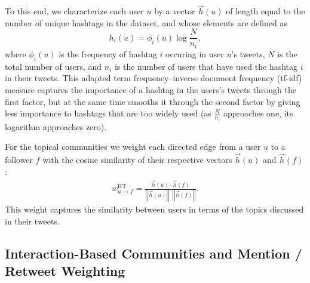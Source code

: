 \documentclass[10pt,letterpaper]{article}
\begin{document}
To this end, we characterize each user $u$ by a vector $\vec{h}(u)$ of length equal to the number of unique hashtags in the dataset, and whose elements are defined as
\begin{equation}
h_i(u) = \phi_i(u)\log{ \frac{N}{n_i} },
\end{equation}
where $\phi_i(u)$ is the frequency of hashtag $i$ occuring in user $u$'s tweets, $N$ is the total number of users, and $n_i$ is the number of users that have used the hashtag $i$ in their tweets. This adapted term frequency--inverse document frequency (tf-idf) measure \cite{salton_introduction_1983} captures the importance of a hashtag in the users's tweets through the first factor, but at the same time smooths it through the second factor by giving less importance to hashtags that are too widely used (as $\frac{N}{n_i}$ approaches one, its logarithm approaches zero). 

For the topical communities we weight each directed edge from a user $u$ to a follower $f$ with the cosine similarity of their respective vectors $\vec{h}(u)$ and $\vec{h}(f)$:
\begin{align}
	w_{u \to f}^{\text{HT}} = \frac{\vec{h}(u) \cdot \vec{h}(f)}{\left|\left|\vec{h}(u)\right|\right| \ \ \left|\left|\vec{h}(f)\right|\right|}. \label{Eqn-EW-topic}
\end{align}
This weight captures the similarity between users in terms of the topics discussed in their tweets. 


\subsection{Interaction-Based Communities and Mention / Retweet Weighting}
\label{sec:method-interaction}
\end{document}
